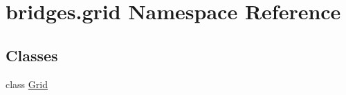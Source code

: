 \hypertarget{namespacebridges_1_1grid}{}\section{bridges.\+grid Namespace Reference}
\label{namespacebridges_1_1grid}
\subsection*{Classes}
\begin{DoxyCompactItemize}
\item 
class \hyperlink{classbridges_1_1grid_1_1_grid}{Grid}
\end{DoxyCompactItemize}

